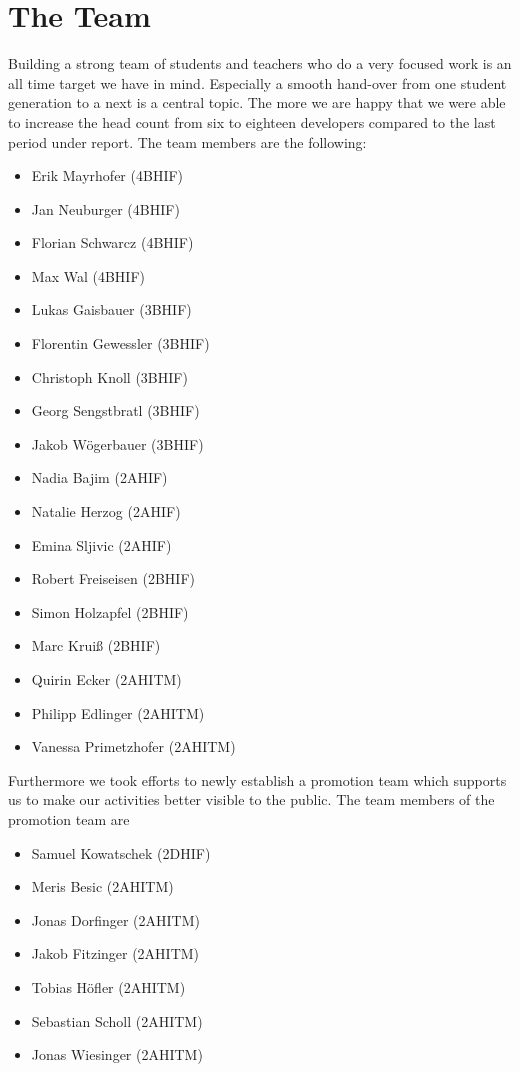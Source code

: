 \documentclass[11pt]{article}
\begin{document}
\section{The Team}
Building a strong team of students and teachers who do a very focused work is an all time target we have in mind. Especially a smooth hand-over from one student generation to a next is a central topic. The more we are happy that we were able to increase the head count from six  to eighteen developers compared to the last period under report. The team members are the following: 

\begin{multicols}{2}
\begin{itemize}
	\item Erik Mayrhofer (4BHIF)
	\item Jan Neuburger (4BHIF)
	\item Florian Schwarcz (4BHIF)
	\item Max Wal (4BHIF)
	\item Lukas Gaisbauer (3BHIF)
	\item Florentin Gewessler (3BHIF)
	\item Christoph Knoll (3BHIF)
	\item Georg Sengstbratl (3BHIF)
	\item Jakob Wögerbauer (3BHIF)
	\item Nadia Bajim (2AHIF)
	\item Natalie Herzog (2AHIF)
	\item Emina Sljivic (2AHIF)
	\item Robert Freiseisen (2BHIF)
	\item Simon Holzapfel (2BHIF)
	\item Marc Kruiß (2BHIF)
	\item Quirin Ecker (2AHITM)
	\item Philipp Edlinger (2AHITM)
	\item Vanessa Primetzhofer (2AHITM)
\end{itemize}
\end{multicols}

Furthermore we took efforts to newly establish a promotion team which supports us to make our activities better visible to the public. The team members of the promotion team are

\begin{multicols}{2}
\begin{itemize}
	\item Samuel Kowatschek (2DHIF)
	\item Meris Besic (2AHITM)
	\item Jonas Dorfinger (2AHITM)
	\item Jakob Fitzinger (2AHITM)
	\item Tobias Höfler (2AHITM)
	\item Sebastian Scholl (2AHITM)
	\item Jonas Wiesinger (2AHITM)
\end{itemize}
\end{multicols}
\end{document}
